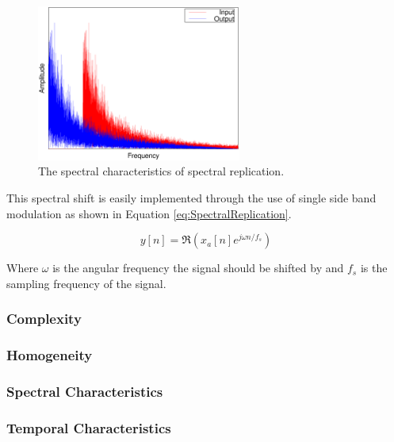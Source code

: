 		\begin{figure}[h!]
			\centering
			\includegraphics[width=0.6\textwidth]{chapter3/Images/SpectralReplicationSpectrum.eps}
			\caption{The spectral characteristics of spectral replication.}
			\label{fig:SpectralReplication}
		\end{figure}

		This spectral shift is easily implemented through the use of single side band modulation as shown in
		Equation \ref{eq:SpectralReplication}.

		\begin{equation}
			y[n] = \Re \left( x_{a}[n] e^{j\omega  n/ f_{s}} \right)
			\label{eq:SpectralReplication}
		\end{equation}

		Where $\omega$ is the angular frequency the signal should be shifted by and $f_{s}$ is the sampling
		frequency of the signal.

		\subsubsection*{Complexity}
		\subsubsection*{Homogeneity}
		\subsubsection*{Spectral Characteristics}
		\subsubsection*{Temporal Characteristics}

